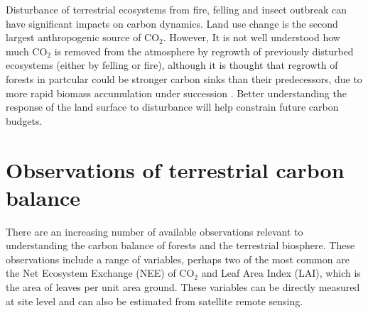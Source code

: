 \documentclass[12pt]{article}
\begin{document}
Disturbance of terrestrial ecosystems from fire, felling and insect outbreak can have significant impacts on carbon dynamics. Land use change is the second largest anthropogenic source of CO\(_{2}\). However, It is not well understood how much CO\(_{2}\) is removed from the atmosphere by regrowth of previously disturbed ecosystems (either by felling or fire), although it is thought that regrowth of forests in partcular could be stronger carbon sinks than their predecessors, due to more rapid biomass accumulation under succession \citep{pan2011large}. Better understanding the response of the land surface to disturbance will help constrain future carbon budgets. 







\section{Observations of terrestrial carbon balance}

There are an increasing number of available observations relevant to understanding the carbon balance of forests and the terrestrial biosphere. These observations include a range of variables, perhaps two of the most common are the Net Ecosystem Exchange (NEE) of CO\(_{2}\) and Leaf Area Index (LAI), which is the area of leaves per unit area ground. These variables can be directly measured at site level and can also be estimated from satellite remote sensing.
\end{document}
